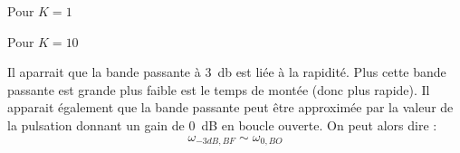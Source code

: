 Pour $K=1$
\begin{center}
    
\end{center}
Pour $K=10$
\begin{center}
    
\end{center}
\clearpage
Il aparrait que la bande passante à \SI{3}{\decibel} est liée à la rapidité. 
Plus cette bande passante est grande plus faible est le temps de montée (donc 
plus rapide). Il apparait également que la bande passante peut être approximée 
par la valeur de la pulsation donnant un gain de \SI{0}{\dB} en boucle ouverte. 
On peut alors dire :
\[
\omega_{-3dB,BF}\sim\omega_{0,BO}
\]


